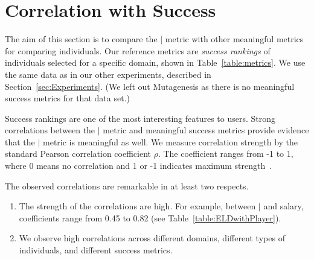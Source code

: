 {\section{Correlation with Success}
\label{sec:success}


The aim of this section is to compare the $\mid$ metric with other meaningful metrics for comparing individuals. Our reference metrics are {\em success rankings} of individuals selected for a specific domain, shown in Table~\ref{table:metrics}. We use the same data as in our other experiments, described in Section~\ref{sec:Experiments}. (We left out Mutagenesis as there is no meaningful success metrics for that data set.)

Success rankings are one of the most interesting features to users. Strong correlations between the $\mid$ metric and meaningful success metrics provide evidence that the $\mid$ metric is meaningful as well. We measure correlation strength by the standard Pearson correlation coefficient $\rho$. The coefficient ranges from -1 to 1, where 0 means no correlation and 1 or -1 indicates maximum strength~\citep{Fisher1921}.

The observed correlations are remarkable in at least two respects. 
\begin{enumerate}
\item The strength of the correlations are high. For example, between $\mid$ and salary, coefficients range from 0.45 to 0.82 (see Table~\ref{table:ELDwithPlayer}).
\item We observe high correlations across different domains, different types of individuals, and different success metrics. 
\end{enumerate}



\begin{table}[htbp]
	
	\centering
\end{table}}
